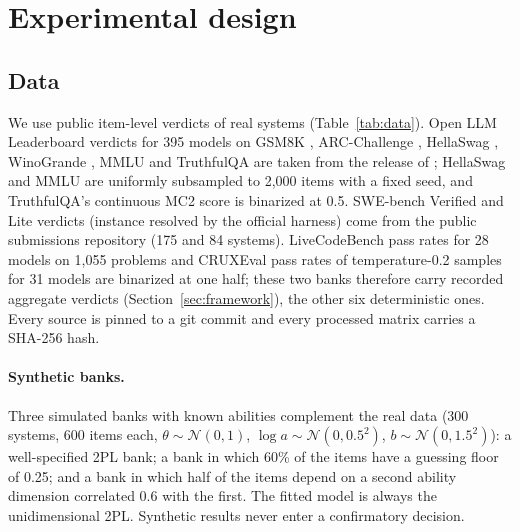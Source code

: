 \section{Experimental design}
\label{sec:design}

\subsection{Data}

We use public item-level verdicts of real systems (Table~\ref{tab:data}). Open LLM
Leaderboard \citep{beeching2023openllm} verdicts for 395 models on GSM8K
\citep{cobbe2021gsm8k}, ARC-Challenge \citep{clark2018arc}, HellaSwag
\citep{zellers2019hellaswag}, WinoGrande \citep{sakaguchi2020winogrande}, MMLU
\citep{hendrycks2021mmlu} and TruthfulQA \citep{lin2022truthfulqa} are taken from the
release of \citet{polo2024tinybenchmarks}; HellaSwag and MMLU are uniformly subsampled to
2,000 items with a fixed seed, and TruthfulQA's continuous MC2 score is binarized at 0.5.
SWE-bench Verified and Lite \citep{jimenez2024swebench} verdicts (instance resolved by the
official harness) come from the public submissions repository (175 and 84 systems).
LiveCodeBench \citep{jain2025livecodebench} pass rates for 28 models on 1,055 problems and
CRUXEval \citep{gu2024cruxeval} pass rates of temperature-0.2 samples for 31 models are
binarized at one half; these two banks therefore carry recorded aggregate verdicts
(Section~\ref{sec:framework}), the other six deterministic ones. Every source is pinned to
a git commit and every processed matrix carries a SHA-256 hash.

\paragraph{Synthetic banks.} Three simulated banks with known abilities complement the
real data (300 systems, 600 items each, $\theta\sim\mathcal N(0,1)$,
$\log a\sim\mathcal N(0,0.5^2)$, $b\sim\mathcal N(0,1.5^2)$): a well-specified 2PL bank; a
bank in which 60\% of the items have a guessing floor of 0.25; and a bank in which half of
the items depend on a second ability dimension correlated 0.6 with the first. The fitted
model is always the unidimensional 2PL. Synthetic results never enter a confirmatory
decision.

